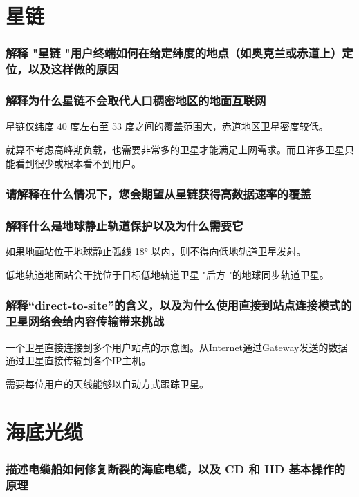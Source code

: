\chapter{星链}

\subsection{解释 "星链 "用户终端如何在给定纬度的地点（如奥克兰或赤道上）定位，以及这样做的原因}

\subsection{解释为什么星链不会取代人口稠密地区的地面互联网}

星链仅纬度 40 度左右至 53 度之间的覆盖范围大，赤道地区卫星密度较低。

就算不考虑高峰期负载，也需要非常多的卫星才能满足上网需求。而且许多卫星只能看到很少或根本看不到用户。

\subsection{请解释在什么情况下，您会期望从星链获得高数据速率的覆盖}

\subsection{解释什么是地球静止轨道保护以及为什么需要它}

如果地面站位于地球静止弧线 18° 以内，则不得向低地轨道卫星发射。

低地轨道地面站会干扰位于目标低地轨道卫星 "后方 "的地球同步轨道卫星。

\subsection{解释``direct‐to‐site''的含义，以及为什么使用直接到站点连接模式的卫星网络会给内容传输带来挑战}

一个卫星直接连接到多个用户站点的示意图。从Internet通过Gateway发送的数据通过卫星直接传输到各个IP主机。

需要每位用户的天线能够以自动方式跟踪卫星。


\chapter{海底光缆}

\subsection{描述电缆船如何修复断裂的海底电缆，以及 CD 和 HD 基本操作的原理}

